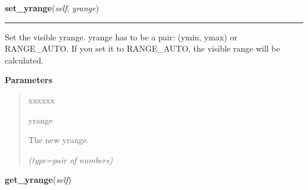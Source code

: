    \label{pygtk_chart:line_chart:LineChart:set_yrange}

    \vspace{0.5ex}

\hspace{.8\funcindent}\begin{boxedminipage}{\funcwidth}

    \raggedright \textbf{set\_yrange}(\textit{self}, \textit{yrange})

    \vspace{-1.5ex}

    \rule{\textwidth}{0.5\fboxrule}
\setlength{\parskip}{2ex}
    Set the visible yrange. yrange has to be a pair: (ymin, ymax) or 
    RANGE\_AUTO. If you set it to RANGE\_AUTO, the visible range will be 
    calculated.

\setlength{\parskip}{1ex}
      \textbf{Parameters}
      \vspace{-1ex}

      \begin{quote}
        \begin{Ventry}{xxxxxx}

          \item[yrange]

          The new yrange.

            {\it (type=pair of numbers)}

        \end{Ventry}

      \end{quote}

    \end{boxedminipage}

    \label{pygtk_chart:line_chart:LineChart:get_yrange}

    \vspace{0.5ex}

\hspace{.8\funcindent}\begin{boxedminipage}{\funcwidth}

    \raggedright \textbf{get\_yrange}(\textit{self})

\setlength{\parskip}{2ex}
\setlength{\parskip}{1ex}
    \end{boxedminipage}


